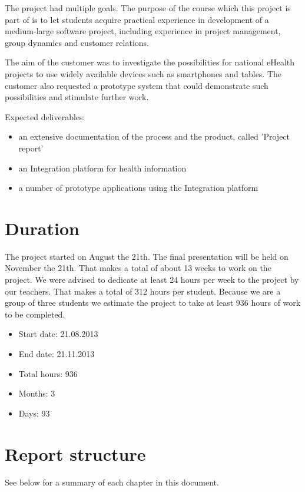 The project had multiple goals.
The purpose of the course which this project is part of is to let students acquire practical experience in development
of a medium-large software project, including experience in project management, group dynamics and customer relations.

The aim of the customer was to investigate the possibilities for national eHealth projects to use widely available
devices such as smartphones and tables. The customer also requested a prototype system that could demonstrate such
possibilities and stimulate further work.

Expected deliverables:
\begin{itemize}
\item an extensive documentation of the process and the product, called 'Project report'
\item an Integration platform for health information
\item a number of prototype applications using the Integration platform
\end{itemize}

\section{Duration}
\label{section:duration}
The project started on August the 21th. The final presentation will be held on November the 21th.
That makes a total of about 13 weeks to work on the project.
We were advised to dedicate at least 24 hours per week to the project by our teachers.
That makes a total of 312 hours per student. Because we are a group of three students we estimate
the project to take at least 936 hours of work to be completed.

\begin{itemize}
\item Start date: 21.08.2013
\item End date: 21.11.2013
\item Total hours: 936
\item Months: 3
\item Days: 93
\end{itemize}

\section{Report structure}

See below for a summary of each chapter in this document.

